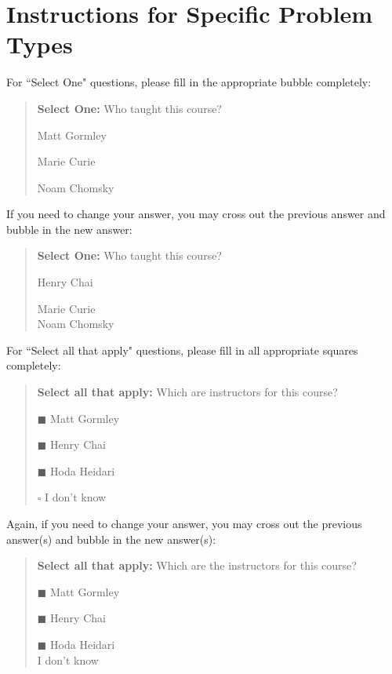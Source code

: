 \section*{Instructions for Specific Problem Types}

For ``Select One" questions, please fill in the appropriate bubble completely:

\begin{quote}
\textbf{Select One:} Who taught this course?
    \begin{list}{}
     \item\CIRCLE{} Matt Gormley
     \item\Circle{} Marie Curie
     \item\Circle{} Noam Chomsky
    \end{list}
\end{quote}

If you need to change your answer, you may cross out the previous answer and bubble in the new answer:

\begin{quote}
\textbf{Select One:} Who taught this course?
    \begin{list}{}
     \item\CIRCLE{} Henry Chai
     \item\Circle{} Marie Curie \\[0.25cm]
     \xcancel{\CIRCLE}{} Noam Chomsky
    \end{list}
\end{quote}

For ``Select all that apply" questions, please fill in all appropriate squares completely:

\begin{quote}
\textbf{Select all that apply:} Which are instructors for this course?
    \begin{list}{}
    \item $\blacksquare$ Matt Gormley  
    \item $\blacksquare$ Henry Chai
    \item $\blacksquare$  Hoda Heidari
    \item $\square$ I don't know
    \end{list}
\end{quote}

Again, if you need to change your answer, you may cross out the previous answer(s) and bubble in the new answer(s):

\begin{quote}
\textbf{Select all that apply:} Which are the instructors for this course?
    \begin{list}{}
    \item $\blacksquare$ Matt Gormley 
    \item $\blacksquare$ Henry Chai
    \item $\blacksquare$ Hoda Heidari \\[0.25cm]
    \xcancel{$\blacksquare$} I don't know
    \end{list}
\end{quote}

